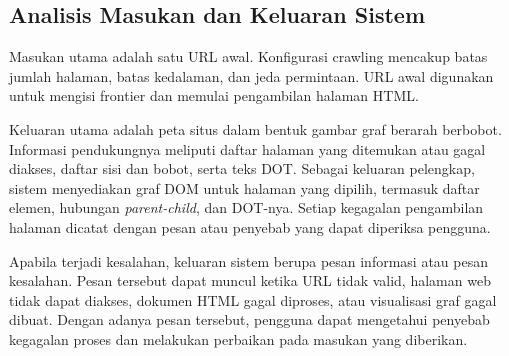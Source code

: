 \subsection{Analisis Masukan dan Keluaran Sistem}
Masukan utama adalah satu URL awal. Konfigurasi crawling mencakup batas jumlah halaman, batas kedalaman, dan jeda permintaan. URL awal digunakan untuk mengisi frontier dan memulai pengambilan halaman HTML.

Keluaran utama adalah peta situs dalam bentuk gambar graf berarah berbobot. Informasi pendukungnya meliputi daftar halaman yang ditemukan atau gagal diakses, daftar sisi dan bobot, serta teks DOT. Sebagai keluaran pelengkap, sistem menyediakan graf DOM untuk halaman yang dipilih, termasuk daftar elemen, hubungan \textit{parent-child}, dan DOT-nya. Setiap kegagalan pengambilan halaman dicatat dengan pesan atau penyebab yang dapat diperiksa pengguna.

Apabila terjadi kesalahan, keluaran sistem berupa pesan informasi atau pesan kesalahan. Pesan tersebut dapat muncul ketika URL tidak valid, halaman web tidak dapat diakses, dokumen HTML gagal diproses, atau visualisasi graf gagal dibuat. Dengan adanya pesan tersebut, pengguna dapat mengetahui penyebab kegagalan proses dan melakukan perbaikan pada masukan yang diberikan.

